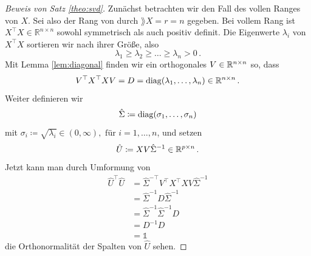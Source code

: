 \documentclass[../Bachelor_LennartKoliwer.tex]{subfiles}
\begin{document}
\begin{proof}[Beweis von Satz \ref{theo:svd}]
	Zunächst betrachten wir den Fall des vollen Ranges von $X$. Sei also der Rang von durch $\rang X = r = n$ gegeben.
	Bei vollem Rang ist \(X^\top X\in\mathbb{R}^{n\times n}\) sowohl symmetrisch als auch positiv definit. Die Eigenwerte \(\lambda_i\) von \(X^\top X\) sortieren wir nach ihrer Größe, also
	\[
		\lambda_1 \geq \lambda_2 \geq \dots \geq \lambda_n > 0\,.
	\]
	Mit Lemma \ref{lem:diagonal} finden wir ein orthogonales \(V \in \mathbb{R}^{n\times n}\) so, dass
	\[
		V^\top X^\top XV=D=\operatorname{diag} (\lambda_1, \dots , \lambda_n) \in \mathbb{R}^{n\times n}\,.
	\]
	Weiter definieren wir
	\[
		\hat{\Sigma}\coloneqq \operatorname{diag} (\sigma_1, \dots, \sigma_n)
	\]
	mit \(\sigma_i \coloneqq \sqrt{\lambda_i}\in(0,\infty),\text{ für } i=1,\dots, n\), und setzen
	\[
		\hat{U}\coloneqq XV\hat{\Sigma}^{-1}\in\mathbb{R}^{p\times n}\,.
	\]
	Jetzt kann man durch Umformung von
	\begin{align*}
		\hat{U}^\top\hat{U} & = \hat{\Sigma}^{-\top}V^\top X^\top XV\hat{\Sigma}^{-1} \\
		                    & =  \hat{\Sigma}^{-1}D\hat{\Sigma}^{-1}                  \\
		                    & =  \hat{\Sigma}^{-1}\hat{\Sigma}^{-1}D                  \\
		                    & =  D^{-1}D                                              \\
		                    & = \mathbb{1}
	\end{align*}
	die Orthonormalität der Spalten von \(\hat{U}\) sehen.


\end{proof}
\end{document}
